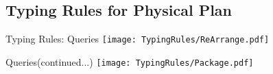 \subsection{Typing Rules for Physical Plan}
\begin{frame}{Typing Rules: Queries}
\centering
\texttt{[image: TypingRules/ReArrange.pdf]} 
\end{frame}

\begin{frame}{Queries(continued...)}
\centering
\texttt{[image: TypingRules/Package.pdf]} 
\end{frame}
